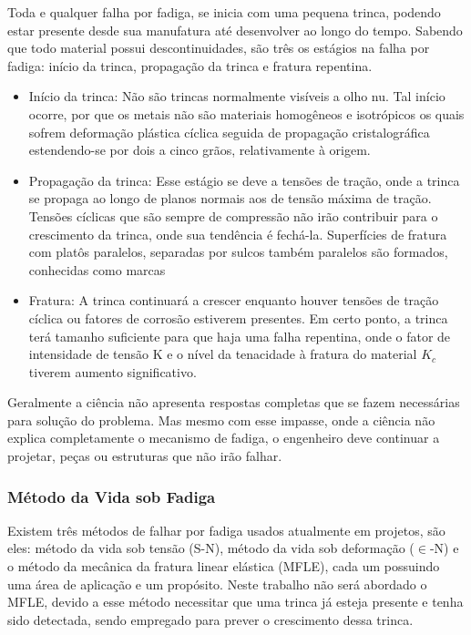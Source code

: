 Toda e qualquer falha por fadiga, se inicia com uma pequena trinca, podendo estar presente desde sua manufatura até desenvolver ao longo do tempo. Sabendo que todo material possui descontinuidades, são três os estágios na falha por fadiga: início da trinca, propagação da trinca e fratura repentina.

\begin{itemize}
	\item Início da trinca: Não são trincas normalmente visíveis a olho nu. Tal início ocorre, por que os metais não são materiais homogêneos e isotrópicos os quais sofrem deformação plástica cíclica seguida de propagação cristalográfica estendendo-se por dois a cinco grãos, relativamente à origem.
	
	\item Propagação da trinca: Esse estágio se deve a tensões de  tração, onde a trinca se propaga ao longo de planos normais aos de tensão máxima de tração. Tensões cíclicas que são sempre de compressão não irão contribuir para o crescimento da trinca, onde sua tendência é fechá-la. Superfícies de fratura com platôs paralelos, separadas por sulcos também paralelos são formados, conhecidas como marcas 
	
	\item Fratura: A trinca continuará a crescer enquanto houver tensões de tração cíclica ou fatores de corrosão estiverem presentes. Em certo ponto, a trinca terá tamanho suficiente para que haja uma falha repentina, onde o fator de intensidade de tensão K e o nível da tenacidade à fratura do material $K_c$  tiverem aumento significativo.
\end{itemize}

Geralmente a ciência  não apresenta respostas completas que se fazem necessárias para solução do problema. Mas mesmo com esse impasse, onde a ciência não explica completamente o mecanismo de fadiga, o engenheiro deve continuar a projetar, peças ou estruturas que não irão falhar.

\subsubsection{Método da Vida sob Fadiga}

Existem três métodos de falhar por fadiga usados atualmente em projetos, são eles: método da vida sob tensão (S-N), método da vida sob deformação ($\in$-N) e o método da mecânica da fratura linear elástica (MFLE), cada um possuindo uma área de aplicação e um propósito. Neste trabalho  não será abordado o MFLE, devido a esse método necessitar que uma trinca já esteja presente e tenha sido detectada, sendo empregado para prever o crescimento dessa trinca.

